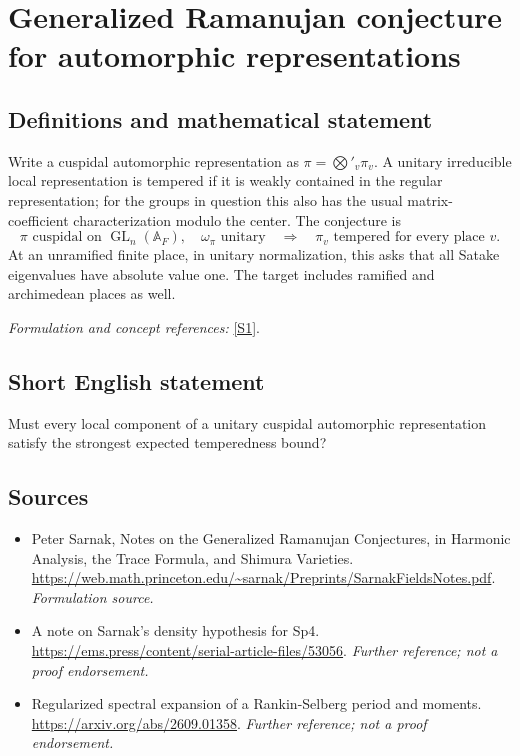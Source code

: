 \documentclass[11pt]{article}
\begin{document}
\section*{\texorpdfstring{Generalized Ramanujan conjecture for automorphic representations}{Generalized Ramanujan conjecture for automorphic representations}}\label{9400078}
\subsection{Definitions and mathematical statement}
Write a cuspidal automorphic representation as $\pi=\bigotimes'_v\pi_v$. A unitary irreducible local representation is tempered if it is weakly contained in the regular representation; for the groups in question this also has the usual matrix-coefficient characterization modulo the center. The conjecture is
\[
 \pi\text{ cuspidal on }\operatorname{GL}_n({\mathbb{A}}_F),\quad
 \omega_\pi\text{ unitary}\quad\Longrightarrow\quad
 \pi_v\text{ tempered for every place }v.
\]
At an unramified finite place, in unitary normalization, this asks that all Satake eigenvalues have absolute value one. The target includes ramified and archimedean places as well.
\par\smallskip\textit{Formulation and concept references:} \href{https://web.math.princeton.edu/~sarnak/Preprints/SarnakFieldsNotes.pdf}{[S1]}.

\subsection{Short English statement}
Must every local component of a unitary cuspidal automorphic representation satisfy the strongest expected temperedness bound?
\subsection{Sources}
\begin{itemize}
\item[S1]Peter Sarnak, Notes on the Generalized Ramanujan Conjectures, in Harmonic Analysis, the Trace Formula, and Shimura Varieties.
\url{https://web.math.princeton.edu/~sarnak/Preprints/SarnakFieldsNotes.pdf}.
\textit{Formulation source.}
\item[S2]A note on Sarnak's density hypothesis for Sp4.
\url{https://ems.press/content/serial-article-files/53056}.
\textit{Further reference; not a proof endorsement.}
\item[S3]Regularized spectral expansion of a Rankin-Selberg period and moments.
\url{https://arxiv.org/abs/2609.01358}.
\textit{Further reference; not a proof endorsement.}
\end{itemize}
\end{document}
